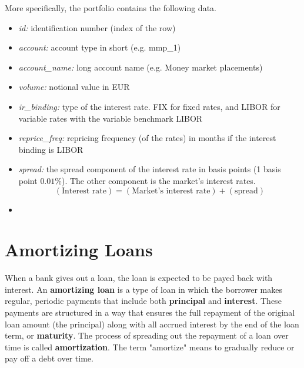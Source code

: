 \documentclass[11pt]{article}
\begin{document}
More specifically, the portfolio contains the following data. 
\begin{itemize}
	\item \textit{id:} identification number (index of the row)
	\item \textit{account:} account type in short (e.g. mmp\_1)
	\item \textit{account\_name:} long account name (e.g. Money market placements)
	\item \textit{volume:} notional value in EUR
	\item \textit{ir\_binding:} type of the interest rate. FIX for fixed rates, and LIBOR for variable rates with the variable benchmark LIBOR
	\item \textit{reprice\_freq:} repricing frequency (of the rates) in months if the interest binding is LIBOR
	\item \textit{spread:} the spread component of the interest rate in basis points (1 basis point $0.01\%$). The other component is the market's interest rates. $$(\text{Interest rate}) = (\text{Market's interest rate})+(\text{spread})$$
	\item 
\end{itemize}

    


\section{Amortizing Loans}

When a bank gives out a loan, the loan is expected to be payed back with interest. An \textbf{amortizing loan} is a type of loan in which the borrower makes regular, periodic payments that include both \textbf{principal} and \textbf{interest}. These payments are structured in a way that ensures the full repayment of the original loan amount (the principal) along with all accrued interest by the end of the loan term, or \textbf{maturity}. The process of spreading out the repayment of a loan over time is called \textbf{amortization}. The term "amortize" means to gradually reduce or pay off a debt over time.\\
\end{document}
